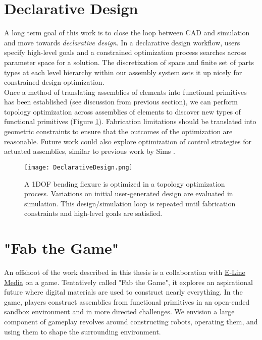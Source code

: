 {\section{Declarative Design}

A long term goal of this work is to close the loop between CAD and simulation and move towards \textit{declarative design}.  In a declarative design workflow, users specify high-level goals and a constrained optimization process searches across parameter space for a solution.  The discretization of space and finite set of parts types at each level hierarchy within our assembly system sets it up nicely for constrained design optimization.\\

Once a method of translating assemblies of elements into functional primitives has been established (see discussion from previous section), we can perform topology optimization across assemblies of elements to discover new types of functional primitives (Figure \ref{fig:DeclarativeDesign}).  Fabrication limitations should be translated into geometric constraints to ensure that the outcomes of the optimization are reasonable.  Future work could also explore optimization of control strategies for actuated assemblies, similar to previous work by Sims \cite{Sims1994}.

\begin{figure}
  \texttt{[image: DeclarativeDesign.png]}
  \caption{A 1DOF bending flexure is optimized in a topology optimization process.  Variations on initial user-generated design are evaluated in simulation.  This design/simulation loop is repeated until fabrication constraints and high-level goals are satisfied.}
  \label{fig:DeclarativeDesign}
\end{figure}

\section{"Fab the Game"}

An offshoot of the work described in this thesis is a collaboration with \href{http://elinemedia.com/}{E-Line Media} on a game.  Tentatively called "Fab the Game", it explores an aspirational future where digital materials are used to construct nearly everything.  In the game, players construct assemblies from functional primitives in an open-ended sandbox environment and in more directed challenges.  We envision a large component of gameplay revolves around constructing robots, operating them, and using them to shape the surrounding environment.\\

}
